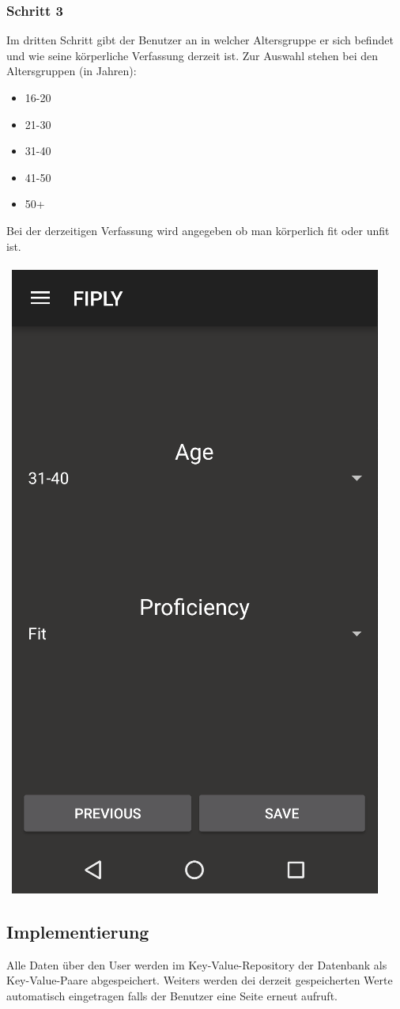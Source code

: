 \documentclass[FIPLY_base.tex]{subfiles}
\begin{document}
\subsubsection{Schritt 3}
Im dritten Schritt gibt der Benutzer an in welcher Altersgruppe er sich befindet und wie seine körperliche Verfassung derzeit ist.
Zur Auswahl stehen bei den Altersgruppen (in Jahren):
\begin{itemize}
\item 16-20
\item 21-30
\item 31-40
\item 41-50
\item 50+
\end{itemize}
Bei der derzeitigen Verfassung wird angegeben ob man körperlich fit oder unfit ist.
\\\
\\\
\includegraphics[scale=0.4]{img/User_step3}

\newpage

\subsection{Implementierung}
Alle Daten über den User werden im Key-Value-Repository der Datenbank als Key-Value-Paare abgespeichert. 
Weiters werden dei derzeit gespeicherten Werte automatisch eingetragen falls der Benutzer eine Seite erneut aufruft.
\end{document}

